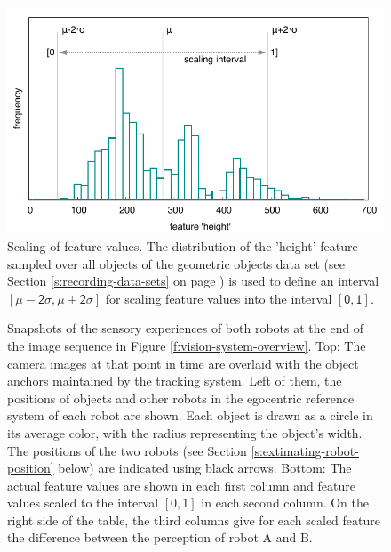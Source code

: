 \begin{figure}[t]
  \parbox{0.75\columnwidth}{%
    \vspace{-3mm}\hspace{3mm}%
    \includegraphics[width=0.75\columnwidth]{figures/vision-system-scaling}}
  \caption{Scaling of feature values. The distribution of the 'height'
    feature sampled over all objects of the geometric objects data set
    (see Section \ref{s:recording-data-sets} on page
    \pageref{s:recording-data-sets}) is used to define an interval
    $\mathsf{[\mu-2\sigma,\mu+2\sigma]}$ for scaling feature values
    into the interval $\mathsf{[0,1]}$.}
  \label{f:vision-system-scaling}
\end{figure}

\begin{figure}[t]
  
  \caption{Snapshots of the sensory experiences of both robots at the
    end of the image sequence in Figure
    \ref{f:vision-system-overview}. Top: The camera images at that
    point in time are overlaid with the object anchors maintained by
    the tracking system. Left of them, the positions of objects and
    other robots in the egocentric reference system of each robot are
    shown. Each object is drawn as a circle in its average color, with
    the radius representing the object's width. The positions of the
    two robots (see Section \ref{s:extimating-robot-position} below)
    are indicated using black arrows. Bottom: The actual feature
    values are shown in each first column and feature values scaled to
    the interval $[0,1]$ in each second column.  On the right side of
    the table, the third columns give for each scaled feature the
    difference between the perception of robot A and B.}
  \label{f:vision-system-example-scene}
\end{figure}

